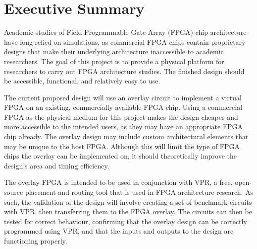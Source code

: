 \thispagestyle{empty}
\section*{Executive Summary}


Academic studies of Field Programmable Gate Array (FPGA) chip architecture have long relied on simulations, as commercial FPGA chips contain proprietary designs that make their underlying architecture inaccessible to academic researchers.
The goal of this project is to provide a physical platform for researchers to carry out FPGA architecture studies.
The finished design should be accessible, functional, and relatively easy to use.

The current proposed design will use an overlay circuit to implement a virtual FPGA on an existing, commercially available FPGA chip.
Using a commercial FPGA as the physical medium for this project makes the design cheaper and more accessible to the intended users, as they may have an appropriate FPGA chip already.
The overlay design may include custom architectural elements that may be unique to the host FPGA.
Although this will limit the type of FPGA chips the overlay can be implemented on, it should theoretically improve the design's area and timing efficiency.

The overlay FPGA is intended to be used in conjunction with VPR, a free, open-source placement and routing tool that is used in FPGA architecture research.
As such, the validation of the design will involve creating a set of benchmark circuits with VPR, then transferring them to the FPGA overlay.
The circuits can then be tested for correct behaviour, confirming that the overlay design can be correctly programmed using VPR, and that the inputs and outputs to the design are functioning properly.